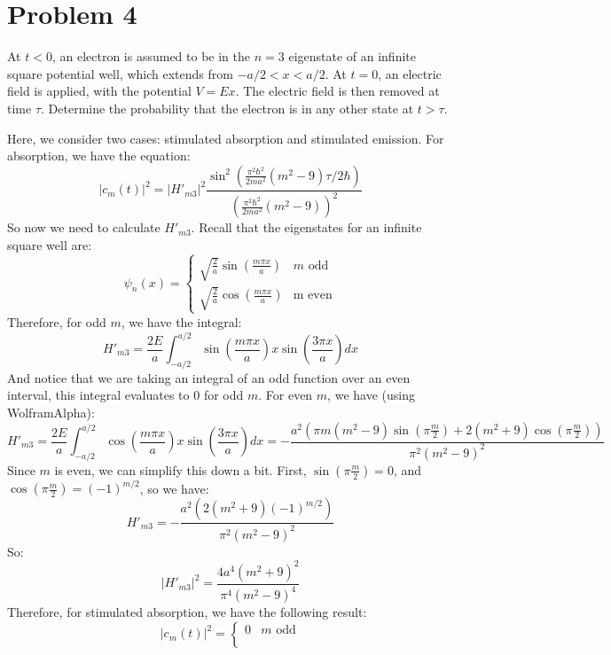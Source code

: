 \documentclass[10pt]{article}
\begin{document}
	\pagebreak

	\section*{Problem 4}
	At $t < 0$, an electron is assumed to be in the $n=3$ eigenstate of an infinite square potential well, which 
	extends from $-a/2< x < a/2$. At $t = 0$, an electric field is applied, with the potential $V = Ex$. The 
	electric field is then removed at time $\tau$. Determine the probability that the electron is in any other 
	state at $t > \tau$. 

	\begin{solution}
		Here, we consider two cases: stimulated absorption and stimulated emission. For absorption, we have 
		the equation:
		\[
			|c_m(t)|^2 = |H'_{m 3}|^2 \frac{\sin^2\left(\frac{\pi^2 \hbar^2}{2ma^2}(m^2 - 9)
			\tau/2\hbar \right)}{\left( \frac{\pi^2 \hbar^2}{2ma^2}(m^2 - 9)\right)^2}
		\] 
		So now we need to calculate $H'_{m 3}$. Recall that the eigenstates for an infinite square well are:
		\[
		\psi_n(x) = \begin{cases}
			\sqrt{\frac{2}{a}} \sin\left( \frac{m \pi x}{a} \right) & \text{$m$ odd}\\
			\sqrt{\frac{2}{a}} \cos\left(\frac{m \pi x}{a}\right) & \text{m even}
		\end{cases}
		\] 
		Therefore, for odd $m$, we have the integral:
		\[
			H'_{m 3} = \frac{2E}{a}\int_{-a/2}^{a/2} \sin\left( \frac{m \pi x}{a} \right) x
			\sin\left( \frac{3 \pi x}{a} \right) dx
		\] 
		And notice that we are taking an integral of an odd function over an even interval, this integral 
		evaluates to 0 for odd $m$. For even $m$, we have (using WolframAlpha):
		\[
			H'_{m 3} = \frac{2E}{a}\int_{-a/2}^{a/2} \cos\left( \frac{m \pi x}{a} \right) x 
			\sin\left( \frac{3 \pi x}{a} \right) dx = 
			- \frac{a^2(\pi m (m^2-9)\sin\left( \pi \frac{m}{2} \right) 
			+ 2(m^2 + 9)\cos\left( \pi \frac{m}{2} \right) )}{\pi^2(m^2-9)^2}
		\] 	
		Since $m$ is even, we can simplify this down a bit. First, $\sin\left( \pi \frac{m}{2} \right) = 0$, and
		$\cos\left( \pi \frac{m}{2} \right) = (-1)^{m/2}$, so we have: 
		\[
			H'_{m 3} = -\frac{a^2(2(m^2 + 9)(-1)^{m/2})}{\pi^2 (m^2 - 9)^2}
		\] 
		So:
		\[
			|H'_{m 3}|^2 = \frac{4a^4 (m^2 + 9)^2}{\pi^4(m^2 - 9)^4}
		\] 
		Therefore, for stimulated absorption, we have the following result:
		\[
		|c_m(t)|^2 = \begin{cases}
			0 & \text{$m$ odd}\\
			\\

\end{cases}\]
\end{solution}
\end{document}
